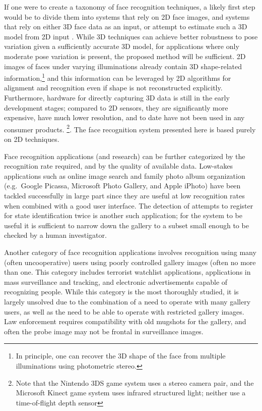 If one were to create a taxonomy of face recognition techniques, a likely first
step would be to divide them into systems that rely on 2D face images, and
systems that rely on either 3D face data as an input, or attempt to estimate
such a 3D model from 2D input \cite{amberg2007reconstructing,Blanz2003-PAMI}.
While 3D techniques can achieve better robustness to pose variation given a
sufficiently accurate 3D model, for applications where only moderate pose
variation is present, the proposed method will be sufficient.  2D images of
faces under varying illuminations already contain 3D shape-related
information,\footnote{In principle, one can recover the 3D shape of the face
from multiple illuminations using photometric stereo.} and this information can
be leveraged by 2D algorithms for alignment and recognition even if shape is
not reconstructed explicitly.  Furthermore, hardware for directly capturing 3D
data is still in the early development stages; compared to 2D sensors, they are
significantly more expensive, have much lower resolution, and to date have not
been used in any consumer products.  \footnote{Note that the Nintendo 3DS game
system uses a stereo camera pair, and the Microsoft Kinect game system uses
infrared structured light; neither use a time-of-flight depth sensor}.  The
face recognition system presented here is based purely on 2D techniques.

Face recognition applications (and research) can be further categorized by the
recognition rate required, and by the quality of available data.  Low-stakes
applications such as online image search and family photo album organization
(e.g.\ Google Picassa, Microsoft Photo Gallery, and Apple iPhoto) have been
tackled successfully in large part since they are useful at low recognition
rates when combined with a good user interface.  The detection of attempts to
register for state identification twice is another such application; for the
system to be useful it is sufficient to narrow down the gallery to a subset
small enough to be checked by a human investigator.

Another category of face recognition applications involves recognition using
many (often uncooperative) users using poorly controlled gallery images (often
no more than one.  This category includes terrorist watchlist applications,
applications in mass surveillance and tracking, and electronic advertisements
capable of recognizing people.  While this category is the most thoroughly
studied, it is largely unsolved due to the combination of a need to operate
with many gallery users, as well as the need to be able to operate with
restricted gallery images.  Law enforcement requires compatibility with old
mugshots for the gallery, and often the probe image may not be frontal in
surveillance images.

